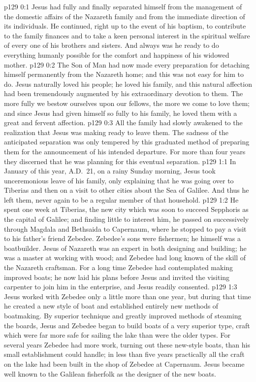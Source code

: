 \author{Midwayer Commission}
\vs p129 0:1 Jesus had fully and finally separated himself from the management of the domestic affairs of the Nazareth family and from the immediate direction of its individuals. He continued, right up to the event of his baptism, to contribute to the family finances and to take a keen personal interest in the spiritual welfare of every one of his brothers and sisters. And always was he ready to do everything humanly possible for the comfort and happiness of his widowed mother.\plusone
\vs p129 0:2 The Son of Man had now made every preparation for detaching himself permanently from the Nazareth home; and this was not easy for him to do. Jesus naturally loved his people; he loved his family, and this natural affection had been tremendously augmented by his extraordinary devotion to them. The more fully we bestow ourselves upon our fellows, the more we come to love them; and since Jesus had given himself so fully to his family, he loved them with a great and fervent affection.
\vs p129 0:3 All the family had slowly awakened to the realization that Jesus was making ready to leave them. The sadness of the anticipated separation was only tempered by this graduated method of preparing them for the announcement of his intended departure. For more than four years they discerned that he was planning for this eventual separation.
\vs p129 1:1 In January of this year, A.D.~21, on a rainy Sunday morning, Jesus took unceremonious leave of his family, only explaining that he was going over to Tiberias and then on a visit to other cities about the Sea of Galilee. And thus he left them, never again to be a regular member of that household.
\vs p129 1:2 He spent one week at Tiberias, the new city which was soon to succeed Sepphoris as the capital of Galilee; and finding little to interest him, he passed on successively through Magdala and Bethsaida to Capernaum, where he stopped to pay a visit to his father’s friend Zebedee. Zebedee’s sons were fishermen; he himself was a boatbuilder. Jesus of Nazareth was an expert in both designing and building; he was a master at working with wood; and Zebedee had long known of the skill of the Nazareth craftsman. For a long time Zebedee had contemplated making improved boats; he now laid his plans before Jesus and invited the visiting carpenter to join him in the enterprise, and Jesus readily consented.
\vs p129 1:3 Jesus worked with Zebedee only a little more than one year, but during that time he created a new style of boat and established entirely new methods of boatmaking. By superior technique and greatly improved methods of steaming the boards, Jesus and Zebedee began to build boats of a very superior type, craft which were far more safe for sailing the lake than were the older types. For several years Zebedee had more work, turning out these new\hyp{}style boats, than his small establishment could handle; in less than five years practically all the craft on the lake had been built in the shop of Zebedee at Capernaum. Jesus became well known to the Galilean fisherfolk as the designer of the new boats.\plusone
